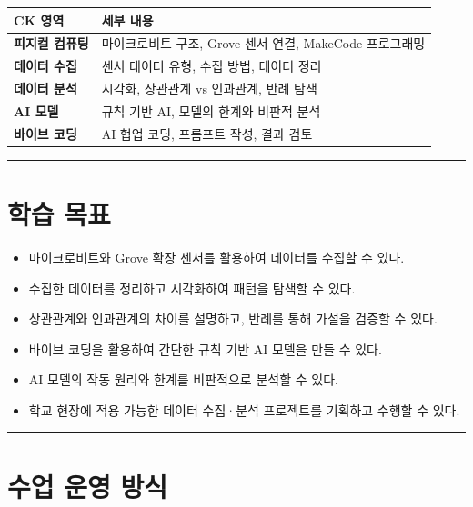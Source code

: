 \documentclass[11pt, a4paper]{article}
\begin{document}
\begin{table}[H]
\centering
\begin{tabular}{|L{3cm}|L{10.5cm}|}
\hline
{}
\textbf{CK 영역} & \textbf{세부 내용} \\
\hline
\textbf{피지컬 컴퓨팅} & 마이크로비트 구조, Grove 센서 연결, MakeCode 프로그래밍 \\
\hline
\textbf{데이터 수집} & 센서 데이터 유형, 수집 방법, 데이터 정리 \\
\hline
\textbf{데이터 분석} & 시각화, 상관관계 vs 인과관계, 반례 탐색 \\
\hline
\textbf{AI 모델} & 규칙 기반 AI, 모델의 한계와 비판적 분석 \\
\hline
\textbf{바이브 코딩} & AI 협업 코딩, 프롬프트 작성, 결과 검토 \\
\hline
\end{tabular}
\end{table}

\vspace{3pt}
\noindent\rule{\textwidth}{0.3pt}

\section{학습 목표}

\begin{itemize}[leftmargin=*, itemsep=3pt]
\item 마이크로비트와 Grove 확장 센서를 활용하여 데이터를 수집할 수 있다.
\item 수집한 데이터를 정리하고 시각화하여 패턴을 탐색할 수 있다.
\item 상관관계와 인과관계의 차이를 설명하고, 반례를 통해 가설을 검증할 수 있다.
\item 바이브 코딩을 활용하여 간단한 규칙 기반 AI 모델을 만들 수 있다.
\item AI 모델의 작동 원리와 한계를 비판적으로 분석할 수 있다.
\item 학교 현장에 적용 가능한 데이터 수집·분석 프로젝트를 기획하고 수행할 수 있다.
\end{itemize}

\vspace{3pt}
\noindent\rule{\textwidth}{0.3pt}

\section{수업 운영 방식}
\end{document}
